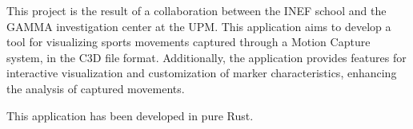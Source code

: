 This project is the result of a collaboration between the \acs{INEF} school and the \acs{GAMMA} investigation center at the \acs{UPM}. This application aims to develop a tool for visualizing sports movements captured through a Motion Capture system, in the \acs{C3D} file format. Additionally, the application provides features for interactive visualization and customization of marker characteristics, enhancing the analysis of captured movements.

This application has been developed in pure Rust.
